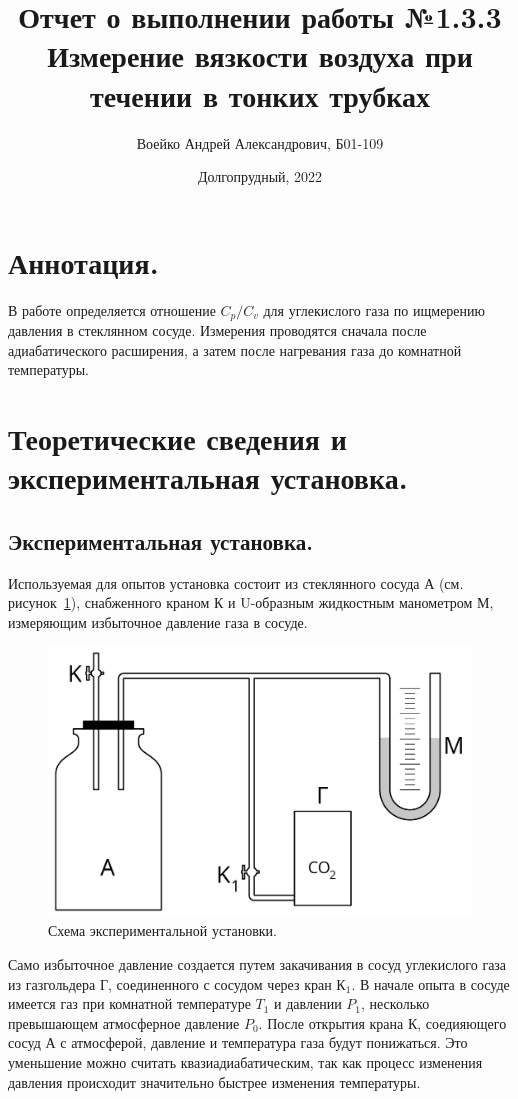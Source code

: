 \documentclass[a4paper,11pt]{article}
\title{Отчет о выполнении работы №1.3.3\\Измерение вязкости воздуха при течении в тонких трубках}
\author{Воейко Андрей Александрович, Б01-109}
\date{Долгопрудный, 2022}
\begin{document}
\maketitle
\newpage
\section{Аннотация.}
В работе определяется отношение $C_{p}/C_{v}$ для углекислого газа по ищмерению давления в стеклянном сосуде. Измерения проводятся сначала после адиабатического расширения, а затем после нагревания газа до комнатной температуры.
\section{Теоретические сведения и экспериментальная установка.}
\subsection{Экспериментальная установка.}
Используемая для опытов установка состоит из стеклянного сосуда А (см. рисунок~\ref{fig:img1}), снабженного краном К и U-образным жидкостным манометром М, измеряющим избыточное давление газа в сосуде.
\begin{figure}
  \includegraphics[scale = 0.224]{scheme1.png}
  \caption{Схема экспериментальной установки.}
  \label{fig:img1}
\end{figure}
Само избыточное давление создается путем закачивания в сосуд углекислого газа из газгольдера Г, соединенного с сосудом через кран $К_{1}$. В начале опыта в сосуде имеется газ при комнатной температуре $T_{1}$ и давлении $P_{1}$, несколько превышающем атмосферное давление $P_{0}$. После открытия крана К, соедияющего сосуд А с атмосферой, давление и температура газа будут понижаться. Это уменьшение можно считать квазиадиабатическим, так как процесс изменения давления происходит значительно быстрее изменения температуры.\\
\end{document}

